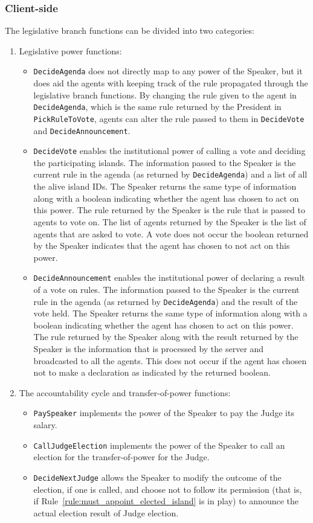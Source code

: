 \subsubsection{Client-side}
The legislative branch functions can be divided into two categories:
\begin{enumerate}
\item Legislative power functions:
    \begin{itemize}
        \item \texttt{DecideAgenda} does not directly map to any power of the Speaker, but it does aid the agents with keeping track of the rule propagated through the legislative branch functions. By changing the rule given to the agent in \texttt{DecideAgenda}, which is the same rule returned by the President in \texttt{PickRuleToVote}, agents can alter the rule passed to them in \texttt{DecideVote} and \texttt{DecideAnnouncement}.
        \item \texttt{DecideVote} enables the institutional power of calling a vote and deciding the participating islands. The information passed to the Speaker is the current rule in the agenda (as returned by \texttt{DecideAgenda}) and a list of all the alive island IDs. The Speaker returns the same type of information along with a boolean indicating whether the agent has chosen to act on this power. The rule returned by the Speaker is the rule that is passed to agents to vote on. The list of agents returned by the Speaker is the list of agents that are asked to vote. A vote does not occur the boolean returned by the Speaker indicates that the agent has chosen to not act on this power.
        \item \texttt{DecideAnnouncement} enables the institutional power of declaring a result of a vote on rules. The information passed to the Speaker is the current rule in the agenda (as returned by \texttt{DecideAgenda}) and the result of the vote held. The Speaker returns the same type of information along with a boolean indicating whether the agent has chosen to act on this power. The rule returned by the Speaker along with the result returned by the Speaker is the information that is processed by the server and broadcasted to all the agents. This does not occur if the agent has chosen not to make a declaration as indicated by the returned boolean.
    \end{itemize}
\item The accountability cycle and transfer-of-power functions:
    \begin{itemize}
        \item \texttt{PaySpeaker} implements the power of the Speaker to pay the Judge its salary. 
        \item \texttt{CallJudgeElection} implements the power of the Speaker to call an election for the transfer-of-power for the Judge.
        \item \texttt{DecideNextJudge} allows the Speaker to modify the outcome of the election, if one is called, and choose not to follow its permission (that is, if Rule~\ref{rule:must_appoint_elected_island} is in play) to announce the actual election result of Judge election.
    \end{itemize}
\end{enumerate}

